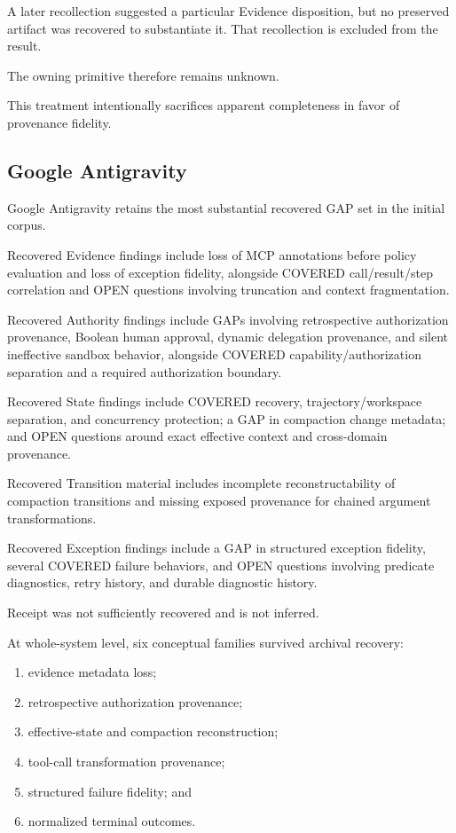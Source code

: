 \documentclass[11pt]{article}
\begin{document}
A later recollection suggested a particular Evidence disposition, but no preserved artifact was recovered to substantiate it. That recollection is excluded from the result.

The owning primitive therefore remains unknown.

This treatment intentionally sacrifices apparent completeness in favor of provenance fidelity.

\subsection{Google Antigravity}

Google Antigravity retains the most substantial recovered GAP set in the initial corpus.

Recovered Evidence findings include loss of MCP annotations before policy evaluation and loss of exception fidelity, alongside COVERED call/result/step correlation and OPEN questions involving truncation and context fragmentation.

Recovered Authority findings include GAPs involving retrospective authorization provenance, Boolean human approval, dynamic delegation provenance, and silent ineffective sandbox behavior, alongside COVERED capability/authorization separation and a required authorization boundary.

Recovered State findings include COVERED recovery, trajectory/workspace separation, and concurrency protection; a GAP in compaction change metadata; and OPEN questions around exact effective context and cross-domain provenance.

Recovered Transition material includes incomplete reconstructability of compaction transitions and missing exposed provenance for chained argument transformations.

Recovered Exception findings include a GAP in structured exception fidelity, several COVERED failure behaviors, and OPEN questions involving predicate diagnostics, retry history, and durable diagnostic history.

Receipt was not sufficiently recovered and is not inferred.

At whole-system level, six conceptual families survived archival recovery:

\begin{enumerate}
\item evidence metadata loss;
\item retrospective authorization provenance;
\item effective-state and compaction reconstruction;
\item tool-call transformation provenance;
\item structured failure fidelity; and
\item normalized terminal outcomes.
\end{enumerate}
\end{document}
